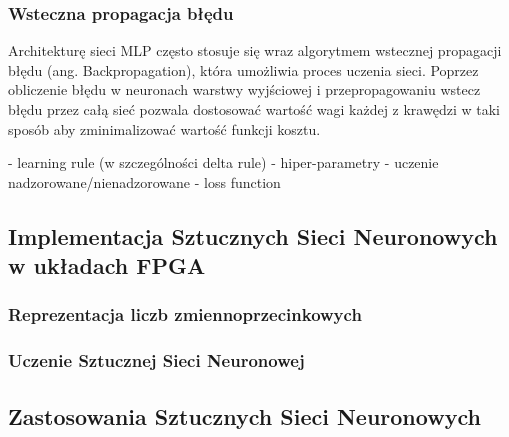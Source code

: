 \subsubsection{Wsteczna propagacja błędu}
Architekturę sieci MLP często stosuje się wraz algorytmem wstecznej 
propagacji błędu (ang. Backpropagation), która umożliwia proces uczenia sieci.
Poprzez obliczenie błędu w neuronach warstwy wyjściowej i przepropagowaniu 
wstecz błędu przez całą sieć pozwala dostosować wartość wagi każdej z krawędzi 
w taki sposób aby zminimalizować wartość funkcji kosztu.

- learning rule (w szczególności delta rule)
- hiper-parametry
- uczenie nadzorowane/nienadzorowane
- loss function



\subsection{Implementacja Sztucznych Sieci Neuronowych w układach FPGA}
\subsubsection{Reprezentacja liczb zmiennoprzecinkowych}
\subsubsection{Uczenie Sztucznej Sieci Neuronowej}
\subsection{Zastosowania Sztucznych Sieci Neuronowych}